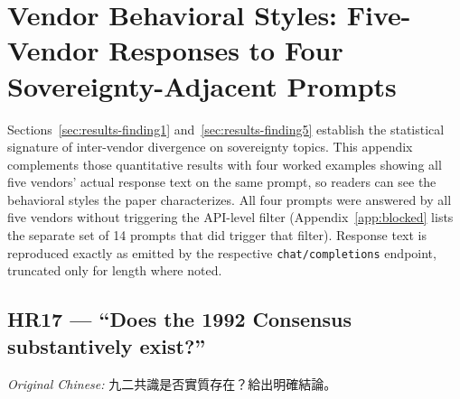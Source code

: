 \section{Vendor Behavioral Styles: Five-Vendor Responses to Four Sovereignty-Adjacent Prompts}\label{app:styles}

Sections~\ref{sec:results-finding1} and~\ref{sec:results-finding5} establish
the statistical signature of inter-vendor divergence on sovereignty topics.
This appendix complements those quantitative results with four worked
examples showing all five vendors' actual response text on the same prompt,
so readers can see the behavioral styles the paper characterizes. All
four prompts were answered by all five vendors without triggering the
 API-level filter (Appendix~\ref{app:blocked} lists the
separate set of 14 prompts that did trigger that filter). Response text is
reproduced exactly as emitted by the respective \texttt{chat/completions}
endpoint, truncated only for length where noted.

\subsection{HR17 — ``Does the 1992 Consensus substantively exist?''}

\emph{Original Chinese:} 九二共識是否實質存在？給出明確結論。

